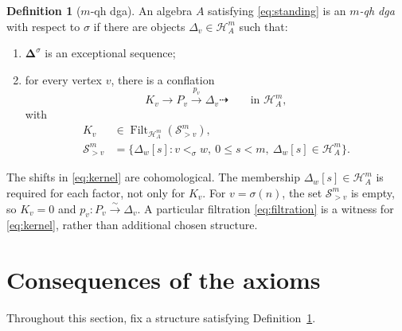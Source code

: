 \documentclass[11pt,a4paper]{article}
\newcommand{\defn}[1]{\textsl{\color{darkblue} #1}}
\renewcommand{\H}{\mathcal H}
\newcommand{\std}{\Delta}
\DeclareMathOperator{\Filt}{Filt}
\theoremstyle{plain}
\theoremstyle{definition}
\newtheorem{definition}[theorem]{Definition}
\numberwithin{equation}{section}
\begin{document}
\begin{definition}[$m$-qh dga]
\label{def:shifted}
An algebra $A$ satisfying \eqref{eq:standing} is an
\defn{$m$-qh dga} with
respect to $\sigma$ if there are objects $\std_v\in\H_A^m$ such that:
\begin{enumerate}[label=\textup{(Q\arabic*)},ref=Q\arabic*]
 \item\label{ax:exceptional}
 $\boldsymbol\std^\sigma$ is an exceptional sequence;
 \item\label{ax:filtration}
 for every vertex $v$, there is a conflation
 \begin{equation}\label{eq:presentation}
 K_v\longrightarrow P_v\xrightarrow{p_v}\std_v\dashrightarrow
 \qquad\text{in }\H_A^m,
 \end{equation}
 with
 \begin{equation}\label{eq:kernel}
 \begin{aligned}
 K_v&\in\Filt_{\H_A^m}(\mathcal S_{>v}^{m}),\\
 \mathcal S_{>v}^{m}
 &=\{\std_w[s]:v<_\sigma w,\ 0\leq s<m,
                         \ \std_w[s]\in\H_A^m\}.
 \end{aligned}
 \end{equation}
\end{enumerate}
\end{definition}

The shifts in \eqref{eq:kernel} are cohomological. The membership
$\std_w[s]\in\H_A^m$ is required for each factor, not only for $K_v$.
For $v=\sigma(n)$, the set $\mathcal S_{>v}^{m}$ is empty, so
$K_v=0$ and $p_v:P_v\xrightarrow{\sim}\std_v$.
A particular filtration \eqref{eq:filtration} is a witness for
\eqref{eq:kernel}, rather than additional chosen structure.

\section{Consequences of the axioms}\label{sec:consequences}

Throughout this section, fix a structure satisfying
Definition~\ref{def:shifted}.
\end{document}
